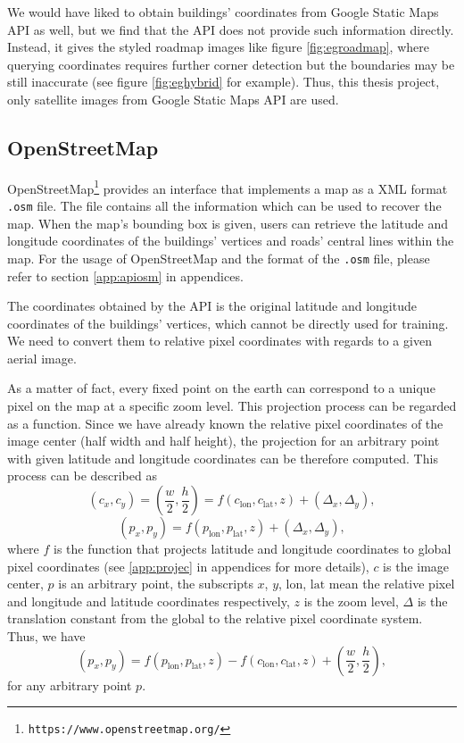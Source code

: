 

We would have liked to obtain buildings' coordinates from Google Static Maps API as well, but we find that the API does not provide such information directly. Instead, it gives the styled roadmap images like figure \ref{fig:egroadmap}, where querying coordinates requires further corner detection but the boundaries may be still inaccurate (see figure \ref{fig:eghybrid} for example). Thus, this thesis project, only satellite images from Google Static Maps API are used.

\subsection{OpenStreetMap}\label{apiosm}
OpenStreetMap\setcounter{footnote}{0}\footnote{\lstinline{https://www.openstreetmap.org/}} provides an interface that implements a map as a XML format \lstinline{.osm} file. The file contains all the information which can be used to recover the map. When the map's bounding box is given, users can retrieve the latitude and longitude coordinates of the buildings' vertices and roads' central lines within the map. For the usage of OpenStreetMap and the format of the \lstinline{.osm} file, please refer to section \ref{app:apiosm} in appendices.

The coordinates obtained by the API is the original latitude and longitude coordinates of the buildings' vertices, which cannot be directly used for training. We need to convert them to relative pixel coordinates with regards to a given aerial image.

As a matter of fact, every fixed point on the earth can correspond to a unique pixel on the map at a specific zoom level. This projection process can be regarded as a function. Since we have already known the relative pixel coordinates of the image center (half width and half height), the projection for an arbitrary point with given latitude and longitude coordinates can be therefore computed. This process can be described as
\begin{equation}
	(c_x, c_y) = (\frac{w}{2}, \frac{h}{2}) = f(c_{\text{lon}}, c_{\text{lat}}, z) + (\Delta_x, \Delta_y),
\end{equation}
\begin{equation}
	(p_x, p_y) = f(p_{\text{lon}}, p_{\text{lat}}, z) + (\Delta_x, \Delta_y),
\end{equation}
where $f$ is the function that projects latitude and longitude coordinates to global pixel coordinates (see \ref{app:projec} in appendices for more details), $c$ is the image center, $p$ is an arbitrary point, the subscripts $x$, $y$, $\text{lon}$, $\text{lat}$ mean the relative pixel and longitude and latitude coordinates respectively, $z$ is the zoom level, $\Delta$ is the translation constant from the global to the relative pixel coordinate system. Thus, we have
\begin{equation}
	(p_x, p_y) = f(p_{\text{lon}}, p_{\text{lat}}, z) - f(c_{\text{lon}}, c_{\text{lat}}, z) + (\frac{w}{2}, \frac{h}{2}),
\end{equation}
for any arbitrary point $p$.

